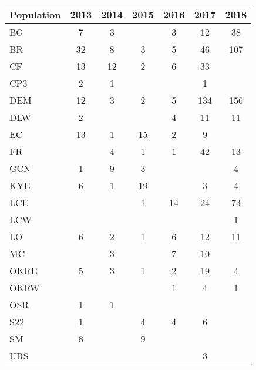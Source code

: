 \documentclass[12pt, oneside, titlepage]{article}   	%
\begin{document}
   \newpage
 
  \label{tab:sigma} 
\begin{table}[ht]
\centering
\begin{tabular}{lcccccc}
  \hline
Population & 2013 & 2014 & 2015 & 2016 & 2017 & 2018 \\ 
  \hline
BG &   7 &   3 &  &   3 &  12 &  38 \\ 
  BR &  32 &   8 &   3 &   5 &  46 & 107 \\ 
  CF &  13 &  12 &   2 &   6 &  33 &  \\ 
  CP3 &   2 &   1 &  &  &   1 &  \\ 
  DEM &  12 &   3 &   2 &   5 & 134 & 156 \\ 
  DLW &   2 &  &  &   4 &  11 &  11 \\ 
  EC &  13 &   1 &  15 &   2 &   9 &  \\ 
  FR &  &   4 &   1 &   1 &  42 &  13 \\ 
  GCN &   1 &   9 &   3 &  &  &   4 \\ 
  KYE &   6 &   1 &  19 &  &   3 &   4 \\ 
  LCE &  &  &   1 &  14 &  24 &  73 \\ 
  LCW &  &  &  &  &  &   1 \\ 
  LO &   6 &   2 &   1 &   6 &  12 &  11 \\ 
  MC &  &   3 &  &   7 &  10 &  \\ 
  OKRE &   5 &   3 &   1 &   2 &  19 &   4 \\ 
  OKRW &  &  &  &   1 &   4 &   1 \\ 
  OSR &   1 &   1 &  &  &  &  \\ 
  S22 &   1 &  &   4 &   4 &   6 &  \\ 
  SM &   8 &  &   9 &  &  &  \\ 
  URS &  &  &  &  &   3 &  \\ 
     \hline
\end{tabular}
\end{table}

  \newpage
  
    \newpage
  
\end{document}
